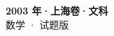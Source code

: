 \documentclass[zihao=-4, a4paper]{ctexart}
\begin{document}
\begin{center}
  {\Large\bfseries 2003 年·上海卷·文科}\\[4pt]
  {\large 数学 · 试题版}
\end{center}
\medskip
{}

\end{document}

